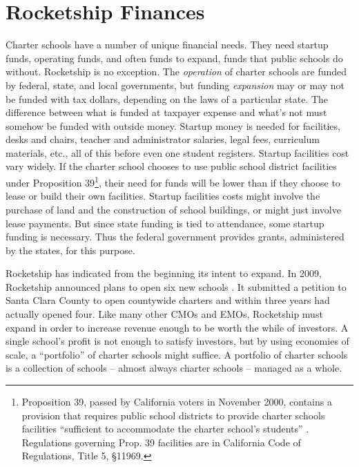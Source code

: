\section{Rocketship Finances}\label{sec:rocketship-finances}\indent

Charter schools have a number of unique financial needs. They need startup funds, operating funds, and often funds to expand, funds that public schools do without. Rocketship is no exception. The \textit{operation} of charter schools are funded by federal, state, and local governments, but funding \textit{expansion} may or may not be funded with tax dollars, depending on the laws of a particular state. The difference between what is funded at taxpayer expense and what's not must somehow be funded with outside money. Startup money is needed for facilities, desks and chairs, teacher and administrator salaries, legal fees, curriculum materials, etc., all of this before even one student registers. Startup facilities cost vary widely. If the charter school chooses to use public school district facilities under Proposition 39\footnote{Proposition 39, passed by California voters in November 2000, contains a provision that requires public school districts to provide charter schools facilities ``sufficient to accommodate the charter school’s students'' \parencite[38—41]{sos.ca2000} \parencite{Prop39.2000}. Regulations governing Prop. 39 facilities are in California Code of Regulations, Title 5, §11969.}, their need for funds will be lower than if they choose to lease or build their own facilities. Startup facilities costs might involve the purchase of land and the construction of school buildings, or might just involve lease payments. But since state funding is tied to attendance, some startup funding is necessary. Thus the federal government provides grants, administered by the states, for this purpose.

Rocketship has indicated from the beginning its intent to expand. In 2009, Rocketship announced plans to open six new schools \parencite{Cook2009}. It submitted a petition to Santa Clara County to open countywide charters and within three years had actually opened four. Like many other CMOs and EMOs, Rocketship must expand in order to increase revenue enough to be worth the while of investors. A single school's profit is not enough to satisfy investors, but by using economies of scale, a ``portfolio'' of charter schools might suffice. A portfolio of charter schools is a collection of schools – almost always charter schools – managed as a whole.

